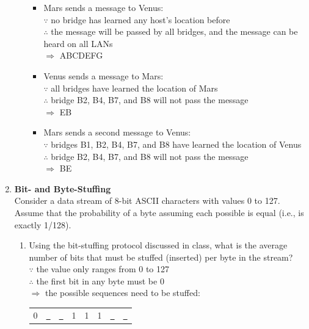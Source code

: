 \documentclass[10pt, a4paper]{article}
\begin{document}
\begin{enumerate}
\begin{enumerate}
            \color{blue}
            \begin{itemize}
            \item Mars sends a message to Venus:\\
                $\because$ no bridge has learned any host's location before\\
                $\therefore$ the message will be passed by all bridges, and the message can be heard on all LANs\\
                $\Rightarrow$ ABCDEFG
            \item Venus sends a message to Mars:\\
                $\because$ all bridges have learned the location of Mars\\
                $\therefore$ bridge B2, B4, B7, and B8 will not pass the message\\
                $\Rightarrow$ EB
            \item Mars sends a second message to Venus:\\
                $\because$ bridges B1, B2, B4, B7, and B8 have learned the location of Venus\\
                $\therefore$ bridge B2, B4, B7, and B8 will not pass the message\\
                $\Rightarrow$ BE
            \end{itemize}
            \color{black}
    \end{enumerate}
\item\mbox{}\textbf{Bit- and Byte-Stuffing}\\
    Consider a data stream of 8-bit ASCII characters with values 0 to 127. Assume that the probability of a byte assuming each possible is equal (i.e., is exactly 1/128).
    \begin{enumerate}
    \item Using the bit-stuffing protocol discussed in class, what is the average number of bits that must be stuffed (inserted) per byte in the stream?\\
        \color{blue}
        $\because$ the value only ranges from 0 to 127\\
        $\therefore$ the first bit in any byte must be 0\\
        $\Rightarrow$ the possible sequences need to be stuffed:\\
        \begin{tabular}{cccccccc}
            0 & \underline{\ } & \underline{\ } & 1 & 1 & 1 & \underline{\ } & \underline{\ }\\

\end{tabular}
\end{enumerate}
\end{enumerate}
\end{document}
